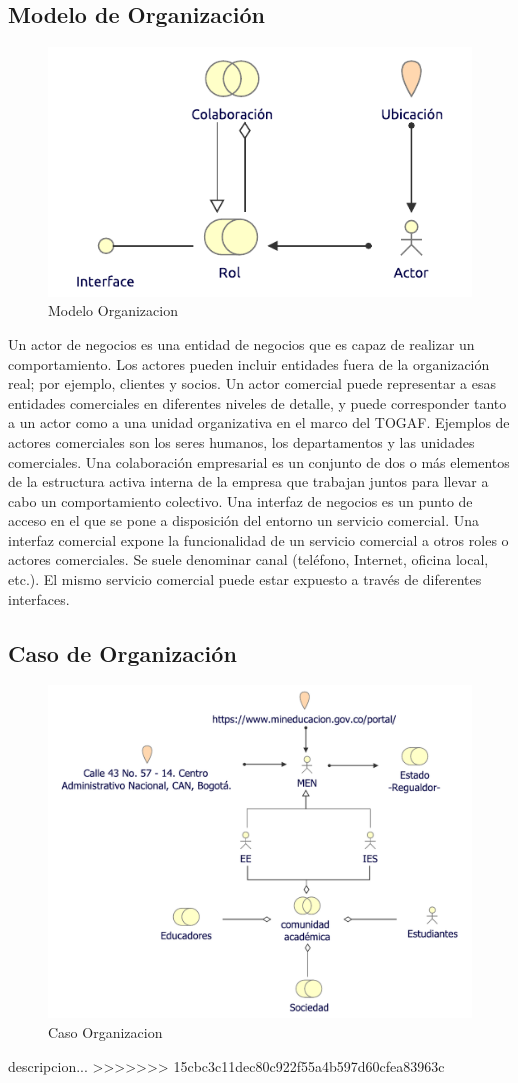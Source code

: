 \subsection{Modelo de Organización}
\begin{figure}[h!]
	\centering
	\includegraphics[width=.6\linewidth]{imgs/modelo/Organizacion}
	\caption{Modelo Organizacion}
\end{figure}

Un actor de negocios es una entidad de negocios que es capaz de realizar un comportamiento. Los actores pueden incluir entidades fuera de la organización real; por ejemplo, clientes y socios. Un actor comercial puede representar a esas entidades comerciales en diferentes niveles de detalle, y puede corresponder tanto a un actor como a una unidad organizativa en el marco del TOGAF. Ejemplos de actores comerciales son los seres humanos, los departamentos y las unidades comerciales. Una colaboración empresarial es un conjunto de dos o más elementos de la estructura activa interna de la empresa que trabajan juntos para llevar a cabo un comportamiento colectivo. Una interfaz de negocios es un punto de acceso en el que se pone a disposición del entorno un servicio comercial. Una interfaz comercial expone la funcionalidad de un servicio comercial a otros roles o actores comerciales. Se suele denominar canal (teléfono, Internet, oficina local, etc.). El mismo servicio comercial puede estar expuesto a través de diferentes interfaces.

\newpage
\subsection{Caso  de Organización}
\begin{figure}[h!]
	\centering
	\includegraphics[width=.9\linewidth]{imgs/caso/negocio/organizacion}
	\caption{Caso Organizacion}
\end{figure}
descripcion...
>>>>>>> 15cbc3c11dec80c922f55a4b597d60cfea83963c
